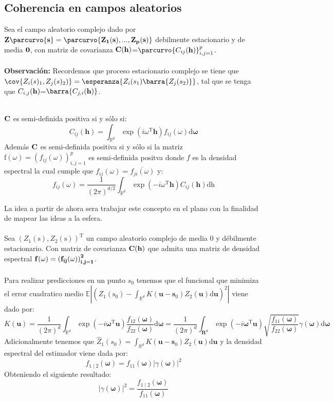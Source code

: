 \subsection{Coherencia en campos aleatorios}
Sea el campo aleatorio complejo dado por $\bf{Z}\parcurvo{\bf{s}} = \parcurvo{ Z_1(\bf{s}),...,Z_p(\bf{s})}$ debilmente estacionario y de media $\bf{0}$, con matriz de covarianza $\bf{C}(\bf{h})$=$\parcurvo{
C_{ij}(\bf{h})
}^p_{i,j=1}$.\\
\\
\textbf{Observación:} Recordemos que proceso estacionario complejo se tiene que $\cov{Z_i(s)_1,Z_j(s)_2)} = \esperanza{Z_i(s_1)\barra{Z_j(s_2)}}$, tal que se tenga que $C_{i,j}(\bf{h})$=$\barra{C_{j,i}(\bf{h})}$.\\
\\
\begin{teo*}{}
$\bf{C}$ es semi-definida positiva si y sólo si:
$$
C_{i j}(\mathbf{h})=\int_{\mathbb{R}^{d}} \exp \left(i \omega^{\mathrm{T}} \mathbf{h}\right) f_{i j}(\omega) \mathrm{d} \boldsymbol{\omega}
$$
Además $\bf{C}$ es semi-definida positiva si y sólo si la matriz $\mathrm{f}(\omega)=\left(f_{i j}(\omega)\right)_{i, j=1}^{p}$ es semi-definida positva donde $f$ es la densidad espectral la cual cumple que $f_{i j}(\omega)=\overline{f_{j i}(\omega)}$ y:
$$
f_{i j}(\omega)=\frac{1}{(2 \pi)^{d/2}} \int_{\mathbb{R}^{d}} \exp \left(-i \omega^{\mathrm{T}} \mathbf{h}\right) C_{i j}(\mathbf{h}) \mathrm{dh}
$$
\end{teo*}
La idea a partir de ahora sera trabajar este concepto en el plano con la finalidad de mapear las ideas a la esfera.\\
\\
Sea $\left(Z_{1}(\mathrm{s}), Z_{2}(\mathrm{s})\right)^{\mathrm{T}}$ un campo aleatorio complejo de media 0 y débilmente estacionario. Con matriz de covarianza  $\bf{C}(\bf{h})$ que admita una matriz de densidad espectral $\bf{f}(\omega)=\left(f_{i j}(\omega)\right)_{i, j=1}^{2}$.\\
\\
Para realizar predicciones en un punto $s_0$ tenemos que el funcional que minimiza el error cuadratico medio $\displaystyle \mathbb{E}\left|\left(Z_{1}\left(\mathrm{s}_{0}\right)-\int_{\mathbb{R}^{d}} K\left(\mathbf{u}-\mathbf{s}_{0}\right) Z_{2}(\mathbf{u}) \mathrm{d} \mathbf{u}\right)^2\right|$ viene dado por:
$$
K(\mathbf{u})=\frac{1}{(2 \pi)^{d}} \int_{\mathbb{R}^{d}} \exp \left(-i \boldsymbol{\omega}^{\mathrm{T}} \mathbf{u}\right) \frac{f_{12}(\boldsymbol{\omega})}{f_{22}(\boldsymbol{\omega})} \mathrm{d} \boldsymbol{\omega}=\frac{1}{(2 \pi)^{d}} \int_{\mathbf{R}^{d}} \exp \left(-i \boldsymbol{\omega}^{\mathrm{T}} \mathbf{u}\right) \sqrt{\frac{f_{11}(\boldsymbol{\omega})}{f_{22}(\boldsymbol{\omega})}} \gamma(\boldsymbol{\omega}) \mathrm{d} \boldsymbol{\omega}
$$
Adicionalmente tenemos que $\displaystyle \hat{Z}_{1}\left(s_{0}\right)=\int_{\mathbb{R}^{d}} K\left(\mathbf{u}-\mathbf{s}_{0}\right) Z_{2}(\mathbf{u}) \mathrm{d} \mathbf{u}$ y la densidad espectral del estimador viene dada por:
$$
f_{1 \mid 2}(\boldsymbol{\omega})=f_{11}(\boldsymbol{\omega})|\gamma(\boldsymbol{\omega})|^{2}
$$
Obteniendo el siguiente resultado:
$$
|\gamma(\boldsymbol{\omega})|^{2}=\frac{f_{1 \mid 2}(\boldsymbol{\omega})}{f_{11}(\boldsymbol{\omega})}
$$